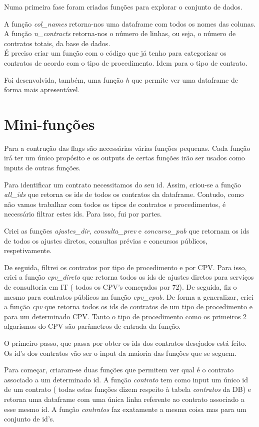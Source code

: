 Numa primeira fase foram criadas funções para explorar o conjunto de dados. 

A função \textit{col\_names} retorna-nos uma dataframe com todos os nomes das colunas. A função \textit{n\_contracts} retorna-nos o número de linhas, ou seja, o número de contratos totais, da base de dados. \\

É preciso criar um função com o código que já tenho para categorizar os contratos de acordo com o tipo de procedimento. Idem para o tipo de contrato. 

Foi desenvolvida, também, uma função \textit{h} que permite ver uma dataframe de forma mais apresentável. 

\section{Mini-funções}

Para a contrução das flags são necessárias várias funções pequenas. Cada função irá ter um único propósito e os outputs de certas funções irão ser usados como inputs de outras funções. 

Para identificar um contrato necessitamos do seu id. Assim, criou-se a função \textit{all\_ids} que retorna os ids de todos os contratos da dataframe. Contudo, como não vamos trabalhar com todos os tipos de contratos e procedimentos, é necessário filtrar estes ids. Para isso, fui por partes.

Criei as funções \textit{ajustes\_dir}, \textit{consulta\_prev} e \textit{concurso\_pub} que retornam os ids de todos os ajustes diretos, consultas prévias e concursos públicos, respetivamente. 

De seguida, filtrei os contratos por tipo de procedimento e por CPV. Para isso, criei a função \textit{cpv\_direto} que retorna todos os ids de ajustes diretos para serviços de consultoria em IT ( todos os CPV's começados por 72). De seguida, fiz o mesmo para contratos públicos na função \textit{cpv\_cpub}. De forma a generalizar, criei a função \textit{cpv} que retorna todos os ids de contratos de um tipo de procedimento e para um determinado CPV. Tanto o tipo de procedimento como os primeiros 2 algarismos do CPV são parâmetros de entrada da função. 

O primeiro passo, que passa por obter os ids dos contratos desejados está feito. Os id's dos contratos vão ser o input da maioria das funções que se seguem. 

Para começar, criaram-se duas funções que permitem ver qual é o contrato associado a um determinado id. A função \textit{contrato} tem como input um único id de um contrato ( todas estas funções dizem respeito à tabela \textit{contratos} da DB) e retorna uma dataframe com uma única linha referente ao contrato associado a esse mesmo id. A função \textit{contratos} faz exatamente a mesma coisa mas para um conjunto de id's. 

